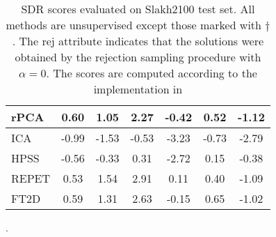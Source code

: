\documentclass[a4paper]{article}
\begin{document}
\begin{table}[t!]
{\begin{tabular}{lcccccl}
\multicolumn{1}{|l|}{rPCA\cite{rpca}}            & 0.60                      & \multicolumn{1}{c|}{1.05}          & 2.27                      & \multicolumn{1}{c|}{-0.42}          & 0.52                    & \multicolumn{1}{c|}{-1.12}          \\ \hline
\multicolumn{1}{|l|}{ICA\cite{ica}}           & -0.99                     & \multicolumn{1}{c|}{-1.53}         & \multicolumn{1}{c}{-0.53} & \multicolumn{1}{c|}{-3.23}         & -0.73                   & \multicolumn{1}{c|}{-2.79}        \\ \hline
\multicolumn{1}{|l|}{HPSS \cite{hpss}}            & -0.56                     & \multicolumn{1}{c|}{-0.33}          & 0.31                     & \multicolumn{1}{c|}{-2.72}          & 0.15                     & \multicolumn{1}{c|}{-0.38}          \\ \hline
\multicolumn{1}{|l|}{REPET\cite{repet}}          & 0.53                      & \multicolumn{1}{c|}{1.54}           & 2.91                      & \multicolumn{1}{c|}{0.11} & 0.40                    & \multicolumn{1}{c|}{-1.09}           \\ \hline
\multicolumn{1}{|l|}{FT2D \cite{ft2d}}            & 0.59                      & \multicolumn{1}{c|}{1.31}          & 2.63                      & \multicolumn{1}{c|}{-0.15}          & 0.65                    & \multicolumn{1}{c|}{-1.02}         \\ \hline
\end{tabular}
}
\vspace{0.1cm}
\caption{SDR scores evaluated on Slakh2100 test set. All methods are unsupervised except those marked with ${\dagger}$. The \textnormal{rej} attribute indicates that the solutions were obtained by the rejection sampling procedure with $\alpha = 0$. The scores are computed according to the implementation in \cite{SiSEC18}}.
\label{table:sdr}
\end{table}
\end{document}
